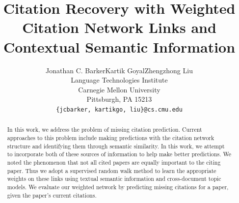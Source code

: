 \documentclass{article} %
\title{Citation Recovery with Weighted Citation Network Links and Contextual Semantic Information}
\author{
Jonathan C. Barker\tab Kartik Goyal\tab Zhengzhong Liu \\
Language Technologies Institute \\
Carnegie Mellon University \\
Pittsburgh, PA 15213 \\
\texttt{\{jcbarker, kartikgo, liu\}@cs.cmu.edu} \\
}
\begin{document}
\maketitle

\begin{abstract}
	In this work, we address the problem of missing citation prediction. Current approaches to this problem include making predictions with the citation network structure and identifying them through semantic similarity. In this work, we attempt to incorporate both of these sources of information to help make better predictions. We noted the phenomenon that not all cited papers are equally important to the citing paper. Thus we adopt a supervised random walk method to learn the appropriate weights on these links using textual semantic information and cross-document topic models. We evaluate our weighted network by predicting missing citations for a paper, given the paper's current citations.
\end{abstract}
\end{document}
